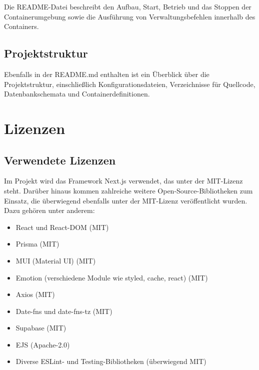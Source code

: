 \documentclass[a4paper,12pt]{article}
\begin{document}
Die README-Datei beschreibt den Aufbau, Start, Betrieb und das Stoppen der Containerumgebung sowie die Ausführung von Verwaltungsbefehlen innerhalb des Containers.


\subsection{Projektstruktur}

Ebenfalls in der README.md enthalten ist ein Überblick über die Projektstruktur, einschließlich Konfigurationsdateien, Verzeichnisse für Quellcode, Datenbankschemata und Containerdefinitionen.

\newpage


\section{Lizenzen}

\subsection{Verwendete Lizenzen}

Im Projekt wird das Framework Next.js verwendet, das unter der MIT-Lizenz steht. Darüber hinaus kommen zahlreiche weitere Open-Source-Bibliotheken zum Einsatz, die überwiegend ebenfalls unter der MIT-Lizenz veröffentlicht wurden. Dazu gehören unter anderem:

\begin{itemize}
  \item React und React-DOM (MIT)
  \item Prisma (MIT)
  \item MUI (Material UI) (MIT)
  \item Emotion (verschiedene Module wie styled, cache, react) (MIT)
  \item Axios (MIT)
  \item Date-fns und date-fns-tz (MIT)
  \item Supabase (MIT)
  \item EJS (Apache-2.0)
  \item Diverse ESLint- und Testing-Bibliotheken (überwiegend MIT)
\end{itemize}
\end{document}
